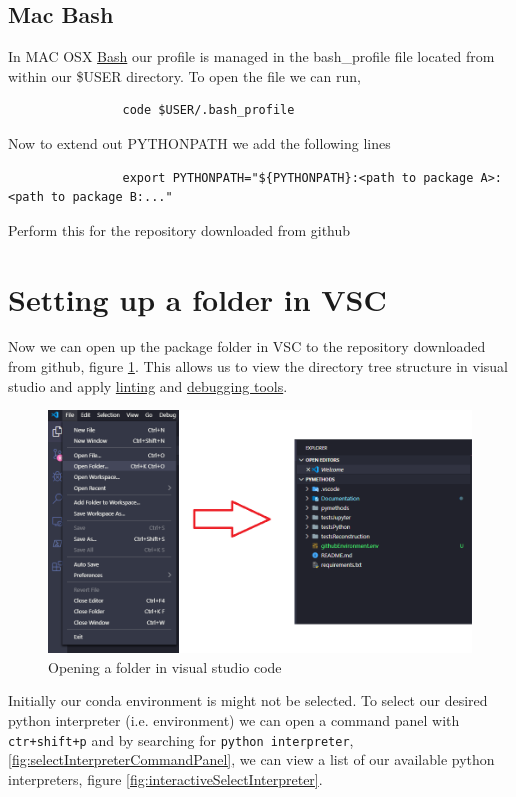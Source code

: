\documentclass[10pt,a4paper]{article}
\begin{document}
		\subsection{Mac Bash}
			In MAC OSX \href{https://help.ubuntu.com/community/Beginners/BashScripting}{Bash} our profile is managed in the bash\_profile file located from within our \$USER directory. To open the file we can run,
			\begin{verbatim}
				code $USER/.bash_profile
			\end{verbatim}
			Now to extend out PYTHONPATH we add the following lines
			\begin{verbatim}
				export PYTHONPATH="${PYTHONPATH}:<path to package A>:<path to package B:..."
			\end{verbatim}
		Perform this for the repository downloaded from github
		
	\section{Setting up a folder in VSC}
		Now we can open up the package folder in VSC to the repository downloaded from github, figure \ref{fig:openFolder}. This allows us to view the directory tree structure in visual studio and apply \href{https://code.visualstudio.com/docs/python/linting}{linting} and \href{https://code.visualstudio.com/docs/python/debugging}{debugging tools}.
		\begin{figure}[h]
			\centering
			\includegraphics[scale=0.5]{figures/folder.PNG}
			\caption{Opening a folder in visual studio code}
			\label{fig:openFolder}
		\end{figure}
	
		Initially our conda environment is might not be selected. To select our desired python interpreter (i.e. environment) we can open a command panel with \verb|ctr+shift+p| and by searching for \verb|python interpreter|, \ref{fig:selectInterpreterCommandPanel}, we can view a list of our available python interpreters, figure \ref{fig:interactiveSelectInterpreter}.
		
\end{document}
